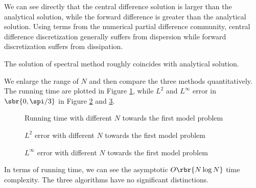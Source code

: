 \documentclass[english, nochinese]{pnote}
\begin{document}
We can see directly that the central difference solution is larger than the analytical solution, while the forward difference is greater than the analytical solution. Using terms from the numerical partial difference community, central difference discretization generally suffers from dispersion while forward discretization suffers from dissipation.

The solution of spectral method roughly coincides with analytical solution.

We enlarge the range of $N$ and then compare the three methods quantitatively. The running time are plotted in Figure \ref{Fig:FirstTime}, while $L^2$ and $L^{\infty}$ error in $ \sbr{ 0, \spi / 3 } $ in Figure \ref{Fig:FirstL2} and \ref{Fig:FirstLInfty}.

\begin{figure}[htbp]
\centering

\caption{Running time with different $N$ towards the first model problem}
\label{Fig:FirstTime}
\end{figure}

\begin{figure}[htbp]
\centering

\caption{$L^2$ error with different $N$ towards the first model problem}
\label{Fig:FirstL2}
\end{figure}

\begin{figure}[htbp]
\centering

\caption{$L^{\infty}$ error with different $N$ towards the first model problem}
\label{Fig:FirstLInfty}
\end{figure}

In terms of running time, we can see the asymptotic $ O \rbr{ N \log N } $ time complexity. The three algorithms have no significant distinctions.
\end{document}
